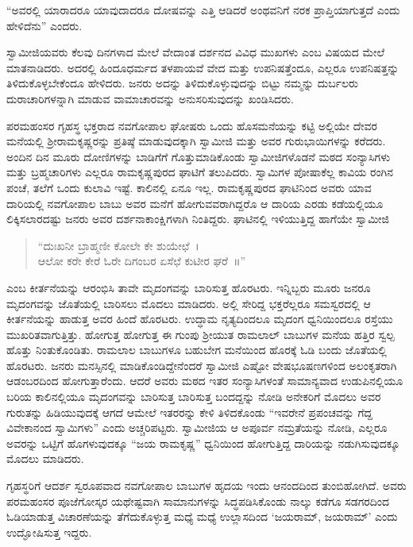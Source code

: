  “ಅವರಲ್ಲಿ ಯಾರಾದರೂ ಯಾವುದಾದರೂ ದೋಷವನ್ನು ಎತ್ತಿ ಆಡಿದರೆ ಅಂಥವನಿಗೆ ನರಕ ಪ್ರಾಪ್ತಿಯಾಗುತ್ತದೆ ಎಂದು ಹೇಳಿದೆನು” ಎಂದರು. 

 ಸ್ವಾಮೀಜಿಯವರು ಕೆಲವು ದಿನಗಳಾದ ಮೇಲೆ ವೇದಾಂತ ದರ್ಶನದ ವಿವಿಧ ಮುಖಗಳು ಎಂಬ ವಿಷಯದ ಮೇಲೆ ಮಾತನಾಡಿದರು. ಅದರಲ್ಲಿ ಹಿಂದೂಧರ್ಮದ ತಳಪಾಯವೆ ವೇದ ಮತ್ತು ಉಪನಿಷತ್ತೆಂದೂ, ಎಲ್ಲರೂ ಉಪನಿಷತ್ತನ್ನು ತಿಳಿದುಕೊಳ್ಳಬೇಕೆಂದೂ ಹೇಳಿದರು. ಜನರು ಅದನ್ನು ತಿಳಿದುಕೊಳ್ಳುವುದನ್ನು ಬಿಟ್ಟು ನಮ್ಮನ್ನು ದುರ್ಬಲರು ದುರಾಚಾರಿಗಳನ್ನಾಗಿ ಮಾಡುವ ವಾಮಾಚಾರವನ್ನು ಅನುಸರಿಸುವುದನ್ನು ಖಂಡಿಸಿದರು. 

 ಪರಮಹಂಸರ ಗೃಹಸ್ಥ ಭಕ್ತರಾದ ನವಗೋಪಾಲ ಘೋಷರು ಒಂದು ಹೊಸಮನೆಯನ್ನು ಕಟ್ಟಿ ಅಲ್ಲಿಯೇ ದೇವರ ಮನೆಯಲ್ಲಿ ಶ‍್ರೀರಾಮಕೃಷ್ಣರನ್ನು ಪ್ರತಿಷ್ಠೆ ಮಾಡುವುದಕ್ಕಾಗಿ ಸ್ವಾಮೀಜಿ ಮತ್ತು ಅವರ ಗುರುಭಾಯಿಗಳನ್ನು ಕರೆದರು. ಅಂದಿನ ದಿನ ಮೂರು ದೋಣಿಗಳನ್ನು ಬಾಡಿಗೆಗೆ ಗೊತ್ತುಮಾಡಿಕೊಂಡು ಸ್ವಾಮೀಜಿಗಳೊಡನೆ ಮಠದ ಸಂನ್ಯಾಸಿಗಳು ಮತ್ತು ಬ್ರಹ್ಮಚಾರಿಗಳು ಎಲ್ಲರೂ ರಾಮಕೃಷ್ಣಪುರದ ಘಾಟಿಗೆ ತಲುಪಿದರು. ಸ್ವಾಮಿಗಳ ಪೋಷಾಕೆಲ್ಲ ಕಾವಿಯ ರಂಗಿನ ಪಂಚೆ, ತಲೆಗೆ ಒಂದು ಕುಲಾವಿ ಇಷ್ಟೆ. ಕಾಲಿನಲ್ಲಿ ಏನೂ ಇಲ್ಲ. ರಾಮಕೃಷ್ಣಪುರದ ಘಾಟಿನಿಂದ ಅವರು ಯಾವ ದಾರಿಯಲ್ಲಿ ನವಗೋಪಾಲ ಬಾಬು ಅವರ ಮನೆಗೆ ಹೋಗುವವರಾಗಿದ್ದರೊ ಆ ದಾರಿಯ ಎರಡು ಕಡೆಯಲ್ಲಿಯೂ ಲಿಕ್ಕಿಸಲಾರದಷ್ಟು ಜನರು ಅವರ ದರ್ಶನಾಕಾಂಕ್ಷಿಗಳಾಗಿ ನಿಂತಿದ್ದರು. ಘಾಟಿನಲ್ಲಿ ಇಳಿಯುತ್ತಿದ್ದ ಹಾಗೆಯೇ ಸ್ವಾಮೀಜಿ

\begin{verse}
“ದುಃಖನೀ ಬ್ರಾಹ್ಮಣೀ ಕೋಲೇ ಕೇ ಶುಯೇಛೆ~।\\ಆಲೋ ಕರೇ ಕೇರೆ ಓರೇ ದಿಗಂಬರ ಏಸೆಛೆ ಕುಟೀರ ಘರೆ~॥”
\end{verse}

 ಎಂಬ ಕೀರ್ತನೆಯನ್ನು ಆರಂಭಿಸಿ ತಾವೇ ಮೃದಂಗವನ್ನು ಬಾರಿಸುತ್ತ ಹೊರಟರು. ಇನ್ನಿಬ್ಬರು ಮೂರು ಜನರೂ‌ ಮೃದಂಗವನ್ನು ಜೊತೆಯಲ್ಲಿ ಬಾರಿಸಲು ಮೊದಲು ಮಾಡಿದರು. ಅಲ್ಲಿ ಸೇರಿದ್ದ ಭಕ್ತರೆಲ್ಲರೂ‌ ಸಮಸ್ವರದಲ್ಲಿ ಆ ಕೀರ್ತನೆಯನ್ನು ಹಾಡುತ್ತ ಅವರ ಹಿಂದೆ ಹೊರಟರು. ಉದ್ಧಾಮ ನೃತ್ಯದಿಂದಲೂ ಮೃದಂಗ ಧ್ವನಿಯಿಂದಲೂ ರಸ್ತೆಯು ಮುಖರಿತವಾಗುತ್ತಿತ್ತು. ಹೋಗುತ್ತ ಹೋಗುತ್ತ ಈ ಗುಂಪು ಶ‍್ರೀಯುತ ರಾಮಲಾಲ್ ಬಾಬುಗಳ ಮನೆಯ ಹತ್ತಿರ ಸ್ವಲ್ಪ ಹೊತ್ತು ನಿಂತುಕೊಂಡಿತು. ರಾಮಲಾಲ ಬಾಬುಗಳೂ ಬಹುಬೇಗ ಮನೆಯಿಂದ ಹೊರಕ್ಕೆ ಓಡಿ ಬಂದು ಜೊತೆಯಲ್ಲಿ ಹೊರಟರು. ಜನರು ಮನಸ್ಸಿನಲ್ಲಿ ಮಾಡಿಕೊಂಡಿದ್ದೇನೆಂದರೆ ಸ್ವಾಮೀಜಿ ಎಷ್ಟೋ ವೇಷಭೂಷಣಗಳಿಂದ ಅಲಂಕೃತರಾಗಿ ಆಡಂಬರದಿಂದ ಹೋಗುತ್ತಾರೆಂದು. ಆದರೆ ಅವರು ಮಠದ ಇತರ ಸಂನ್ಯಾಸಿಗಳಂತೆ ಸಾಮಾನ್ಯವಾದ ಉಡುಪಿನಲ್ಲಿಯೂ ಬರಿಯ ಕಾಲಿನಲ್ಲಿಯೂ ಮೃದಂಗವನ್ನು ಬಾರಿಸುತ್ತ ಬಾರಿಸುತ್ತ ಬಂದದ್ದನ್ನು ನೋಡಿ ಅನೇಕರಿಗೆ ಮೊದಲು ಅವರ ಗುರುತನ್ನು ಹಿಡಿಯುವುದಕ್ಕೆ ಆಗದೆ ಆಮೇಲೆ ಇತರರನ್ನು ಕೇಳಿ ತಿಳಿದಕೊಂಡು “ಇವರೇನೆ ಪ್ರಪಂಚವನ್ನು ಗೆದ್ದ ವಿವೇಕಾನಂದ ಸ್ವಾಮಿಗಳು” ಎಂದು ಅಚ್ಚರಿಪಟ್ಟರು. ಸ್ವಾಮೀಜಿಯ ಆ ಅಪೂರ್ವ ನಮ್ರತೆಯನ್ನು ನೋಡಿ, ಎಲ್ಲರೂ ಅವರನ್ನು ಒಟ್ಟಿಗೆ ಹೊಗಳುವುದಕ್ಕೂ “ಜಯ ರಾಮಕೃಷ್ಣ” ಧ್ವನಿಯಿಂದ ಹೋಗುತ್ತಿದ್ದ ದಾರಿಯನ್ನು ನಡುಗಿಸುವುದಕ್ಕೂ ಮೊದಲು ಮಾಡಿದರು. 

 ಗೃಹಸ್ಥರಿಗೆ ಆದರ್ಶ ಸ್ವರೂಪವಾದ ನವಗೋಪಾಲ ಬಾಬುಗಳ ಹೃದಯ ಇಂದು ಆನಂದದಿಂದ ತುಂಬಿಹೋಗಿದೆ. ಅವರು ಪರಮಹಂಸರ ಪೂಜೆಗೋಸ್ಕರ ಯಥೇಷ್ಟವಾಗಿ ಸಾಮಾನುಗಳನ್ನು ಸಿದ್ಧಪಡಿಸಿಕೊಂಡು ನಾಲ್ಕು ಕಡೆಗೂ ಸಡಗರದಿಂದ ಓಡಿಯಾಡುತ್ತ ವಿಚಾರಣೆಯನ್ನು ತೆಗೆದುಕೊಳ್ಳುತ್ತ ಮಧ್ಯೆ ಮಧ್ಯೆ ಉಲ್ಲಾಸದಿಂದ ‘ಜಯರಾಮ್, ಜಯರಾಮ್’ ಎಂದು ಉದ್ಘೋಷಿಸುತ್ತ ಇದ್ದರು. 


